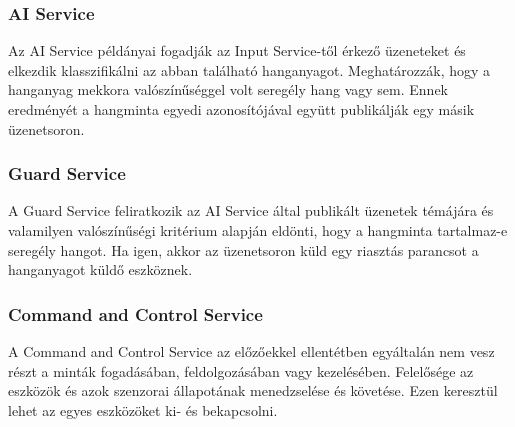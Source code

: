 \subsubsection{AI Service}
Az AI Service példányai fogadják az Input Service-től érkező üzeneteket és elkezdik klasszifikálni az abban található hanganyagot.
Meghatározzák, hogy a hanganyag mekkora valószínűséggel volt seregély hang vagy sem.
Ennek eredményét a hangminta egyedi azonosítójával együtt publikálják egy másik üzenetsoron.

\subsubsection{Guard Service}
A Guard Service feliratkozik az AI Service által publikált üzenetek témájára 
és valamilyen valószínűségi kritérium alapján eldönti, hogy a hangminta tartalmaz-e seregély hangot.
Ha igen, akkor az üzenetsoron küld egy riasztás parancsot a hanganyagot küldő eszköznek.

\subsubsection{Command and Control Service}
A Command and Control Service az előzőekkel ellentétben egyáltalán nem vesz részt a minták fogadásában, feldolgozásában vagy kezelésében.
Felelősége az eszközök és azok szenzorai állapotának menedzselése és követése.
Ezen keresztül lehet az egyes eszközöket ki- és bekapcsolni.